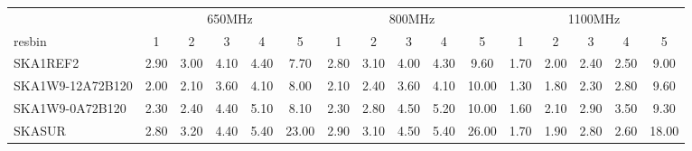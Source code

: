 \begin{table}[!htp]
{{\begin{tabular}{|lccccc||ccccc||ccccc|}
 \tabularnewline \cline{2-16} \multicolumn{1}{c}{ } & \multicolumn{5}{|c}{650MHz}  & \multicolumn{5}{c}{800MHz}  & \multicolumn{5}{c|}{1100MHz} \tabularnewline \cline{1-16} 
 resbin  &1 & 2 & 3 & 4 & 5 & 1 & 2 & 3 & 4 & 5 & 1 & 2 & 3 & 4 & 5 \tabularnewline \hline
SKA1REF2 & 2.90 \cellcolor{blue!60.00} & 3.00 \cellcolor{red!52.36} & 4.10 \cellcolor{green!44.25} & 4.40 \cellcolor{orange!27.69} & 7.70 \cellcolor{purple!18.00} & 2.80 \cellcolor{blue!54.75} & 3.10 \cellcolor{red!60.00} & 4.00 \cellcolor{green!36.67} & 4.30 \cellcolor{orange!24.46} & 9.60 \cellcolor{purple!18.00} & 1.70 \cellcolor{blue!60.00} & 2.00 \cellcolor{red!46.00} & 2.40 \cellcolor{green!25.00} & 2.50 \cellcolor{orange!18.00} & 9.00 \cellcolor{purple!18.00}\\ \hline 
SKA1W9-12A72B120 & 2.00 \cellcolor{blue!18.00} & 2.10 \cellcolor{red!18.00} & 3.60 \cellcolor{green!18.00} & 4.10 \cellcolor{orange!18.00} & 8.00 \cellcolor{purple!18.82} & 2.10 \cellcolor{blue!18.00} & 2.40 \cellcolor{red!18.00} & 3.60 \cellcolor{green!18.00} & 4.10 \cellcolor{orange!18.00} & 10.00 \cellcolor{purple!19.02} & 1.30 \cellcolor{blue!18.00} & 1.80 \cellcolor{red!18.00} & 2.30 \cellcolor{green!18.00} & 2.80 \cellcolor{orange!30.60} & 9.60 \cellcolor{purple!20.80}\\ \hline 
SKA1W9-0A72B120 & 2.30 \cellcolor{blue!32.00} & 2.40 \cellcolor{red!29.45} & 4.40 \cellcolor{green!60.00} & 5.10 \cellcolor{orange!50.31} & 8.10 \cellcolor{purple!19.10} & 2.30 \cellcolor{blue!28.50} & 2.80 \cellcolor{red!42.00} & 4.50 \cellcolor{green!60.00} & 5.20 \cellcolor{orange!53.54} & 10.00 \cellcolor{purple!19.02} & 1.60 \cellcolor{blue!49.50} & 2.10 \cellcolor{red!60.00} & 2.90 \cellcolor{green!60.00} & 3.50 \cellcolor{orange!60.00} & 9.30 \cellcolor{purple!19.40}\\ \hline 
SKASUR & 2.80 \cellcolor{blue!55.33} & 3.20 \cellcolor{red!60.00} & 4.40 \cellcolor{green!60.00} & 5.40 \cellcolor{orange!60.00} & 23.00 \cellcolor{purple!60.00} & 2.90 \cellcolor{blue!60.00} & 3.10 \cellcolor{red!60.00} & 4.50 \cellcolor{green!60.00} & 5.40 \cellcolor{orange!60.00} & 26.00 \cellcolor{purple!60.00} & 1.70 \cellcolor{blue!60.00} & 1.90 \cellcolor{red!32.00} & 2.80 \cellcolor{green!53.00} & 2.60 \cellcolor{orange!22.20} & 18.00 \cellcolor{purple!60.00}\tabularnewline \hline 
\end{tabular}}\hfil 
{}}
\end{table}
